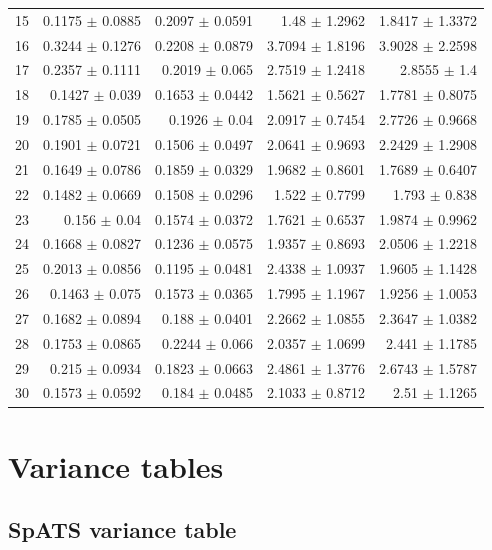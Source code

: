 \begin{table}[ht]
\begin{tabular}{lrrrr}
  15 & 0.1175 $\pm$ 0.0885 & 0.2097 $\pm$ 0.0591 & 1.48 $\pm$ 1.2962 & 1.8417 $\pm$ 1.3372 \\ 
  16 & 0.3244 $\pm$ 0.1276 & 0.2208 $\pm$ 0.0879 & 3.7094 $\pm$ 1.8196 & 3.9028 $\pm$ 2.2598 \\ 
  17 & 0.2357 $\pm$ 0.1111 & 0.2019 $\pm$ 0.065 & 2.7519 $\pm$ 1.2418 & 2.8555 $\pm$ 1.4 \\ 
  18 & 0.1427 $\pm$ 0.039 & 0.1653 $\pm$ 0.0442 & 1.5621 $\pm$ 0.5627 & 1.7781 $\pm$ 0.8075 \\ 
  19 & 0.1785 $\pm$ 0.0505 & 0.1926 $\pm$ 0.04 & 2.0917 $\pm$ 0.7454 & 2.7726 $\pm$ 0.9668 \\ 
  20 & 0.1901 $\pm$ 0.0721 & 0.1506 $\pm$ 0.0497 & 2.0641 $\pm$ 0.9693 & 2.2429 $\pm$ 1.2908 \\ 
  21 & 0.1649 $\pm$ 0.0786 & 0.1859 $\pm$ 0.0329 & 1.9682 $\pm$ 0.8601 & 1.7689 $\pm$ 0.6407 \\ 
  22 & 0.1482 $\pm$ 0.0669 & 0.1508 $\pm$ 0.0296 & 1.522 $\pm$ 0.7799 & 1.793 $\pm$ 0.838 \\ 
  23 & 0.156 $\pm$ 0.04 & 0.1574 $\pm$ 0.0372 & 1.7621 $\pm$ 0.6537 & 1.9874 $\pm$ 0.9962 \\ 
  24 & 0.1668 $\pm$ 0.0827 & 0.1236 $\pm$ 0.0575 & 1.9357 $\pm$ 0.8693 & 2.0506 $\pm$ 1.2218 \\ 
  25 & 0.2013 $\pm$ 0.0856 & 0.1195 $\pm$ 0.0481 & 2.4338 $\pm$ 1.0937 & 1.9605 $\pm$ 1.1428 \\ 
  26 & 0.1463 $\pm$ 0.075 & 0.1573 $\pm$ 0.0365 & 1.7995 $\pm$ 1.1967 & 1.9256 $\pm$ 1.0053 \\ 
  27 & 0.1682 $\pm$ 0.0894 & 0.188 $\pm$ 0.0401 & 2.2662 $\pm$ 1.0855 & 2.3647 $\pm$ 1.0382 \\ 
  28 & 0.1753 $\pm$ 0.0865 & 0.2244 $\pm$ 0.066 & 2.0357 $\pm$ 1.0699 & 2.441 $\pm$ 1.1785 \\ 
  29 & 0.215 $\pm$ 0.0934 & 0.1823 $\pm$ 0.0663 & 2.4861 $\pm$ 1.3776 & 2.6743 $\pm$ 1.5787 \\ 
  30 & 0.1573 $\pm$ 0.0592 & 0.184 $\pm$ 0.0485 & 2.1033 $\pm$ 0.8712 & 2.51 $\pm$ 1.1265 \\ 
   \bottomrule
\end{tabular}
\label{tab:summary_table_all_variables}
\end{table}

\section{Variance tables}
\subsection{SpATS variance table}
\label{appendix:tab_spats_variances}

